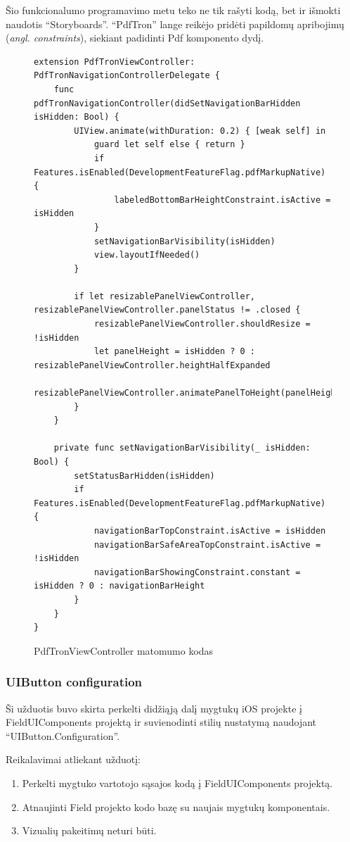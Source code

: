 Šio funkcionalumo programavimo metu teko ne tik rašyti kodą, bet ir išmokti naudotis \enquote{Storyboards}. \enquote{PdfTron} lange reikėjo pridėti papildomų apribojimų (\emph{angl. constraints}), siekiant padidinti Pdf komponento dydį.


\begin{figure}[htbp!]
    \centering
\begin{verbatim}
extension PdfTronViewController: PdfTronNavigationControllerDelegate {
    func pdfTronNavigationController(didSetNavigationBarHidden isHidden: Bool) {
        UIView.animate(withDuration: 0.2) { [weak self] in
            guard let self else { return }
            if Features.isEnabled(DevelopmentFeatureFlag.pdfMarkupNative) {
                labeledBottomBarHeightConstraint.isActive = isHidden
            }
            setNavigationBarVisibility(isHidden)
            view.layoutIfNeeded()
        }

        if let resizablePanelViewController, resizablePanelViewController.panelStatus != .closed {
            resizablePanelViewController.shouldResize = !isHidden
            let panelHeight = isHidden ? 0 : resizablePanelViewController.heightHalfExpanded
            resizablePanelViewController.animatePanelToHeight(panelHeight)
        }
    }

    private func setNavigationBarVisibility(_ isHidden: Bool) {
        setStatusBarHidden(isHidden)
        if Features.isEnabled(DevelopmentFeatureFlag.pdfMarkupNative) {
            navigationBarTopConstraint.isActive = isHidden
            navigationBarSafeAreaTopConstraint.isActive = !isHidden
            navigationBarShowingConstraint.constant = isHidden ? 0 : navigationBarHeight
        }
    }
}
\end{verbatim}
\caption{PdfTronViewController matomumo kodas}
    \label{fig:pdfTronCode}
\end{figure}


    
\subsubsection{UIButton configuration}
Ši užduotis buvo skirta perkelti didžiąją dalį mygtukų iOS projekte į FieldUIComponents projektą ir suvienodinti stilių nustatymą naudojant \enquote{UIButton.Configuration}.

Reikalavimai atliekant užduotį:
\begin{enumerate}
    \item Perkelti mygtuko vartotojo sąsajos kodą į FieldUIComponents projektą.
    \item Atnaujinti Field projekto kodo bazę su naujais mygtukų komponentais.
    \item Vizualių pakeitimų neturi būti.
\end{enumerate}

